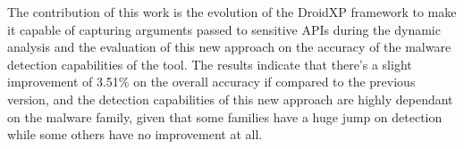 The contribution of this work is the evolution of the DroidXP framework to make it capable of capturing arguments passed to sensitive APIs during the dynamic analysis and the evaluation of this new approach on the accuracy of the malware detection capabilities of the tool. The results indicate that there's a slight improvement of 3.51\% on the overall accuracy if compared to the previous version, and the detection capabilities of this new approach are highly dependant on the malware family, given that some families have a huge jump on detection while some others have no improvement at all.